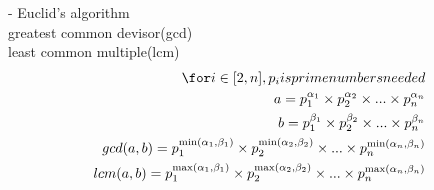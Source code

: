 \documentclass{article}
\begin{document}
- Euclid's algorithm \\
greatest common devisor(gcd) \\
least common multiple(lcm) \\
\begin{align*}
    \for i \in [2, n], p_i is prime numbers needed \\
    a = p_1^{\alpha_1} \times p_2^{\alpha_2} \times ... \times p_n^{\alpha_n} \\
    b = p_1^{\beta_1} \times p_2^{\beta_2} \times ... \times p_n^{\beta_n} \\
    gcd(a, b) = p_1^{\min(\alpha_1, \beta_1)} \times p_2^{\min(\alpha_2, \beta_2)} \times  ... \times p_n^{\min(\alpha_n, \beta_n)} \\
    lcm(a, b) = p_1^{\max(\alpha_1, \beta_1)} \times p_2^{\max(\alpha_2, \beta_2)} \times ... \times p_n^{\max(\alpha_n, \beta_n)} \\
\end{align*}
\end{document}
